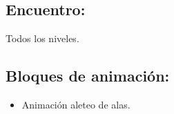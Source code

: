 \subsection{Encuentro:}
Todos los niveles.
\subsection{Bloques de animación:}
\begin{itemize}
	\item Animación aleteo de alas.
\end{itemize}
